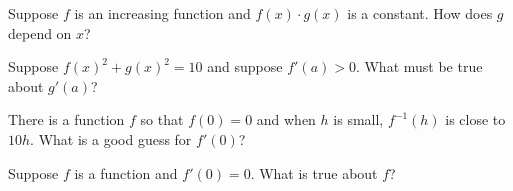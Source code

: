 \documentclass{ximera}
\newcommand{\recommendation}[1]{}
\begin{document}
\begin{shuffle}
\begin{problem}
  Suppose $f$ is an increasing function and $f(x) \cdot g(x)$ is a constant.  How does $g$ depend on $x$?
  \begin{multipleChoice}
  \end{multipleChoice}
\end{problem}

\begin{problem}
  Suppose $f(x)^2 + g(x)^2 = 10$ and suppose $f'(a) > 0$.  What must be true about $g'(a)$?
  \begin{multipleChoice}
  \end{multipleChoice}
\end{problem}



\begin{problem}
  There is a function $f$ so that $f(0) = 0$ and when $h$ is small, $f^{-1}(h)$ is close to $10 h$.  What is a good guess for $f'(0)$?
  \begin{multipleChoice}
  \end{multipleChoice}
\end{problem}

\begin{problem}
  Suppose $f$ is a function and $f'(0) = 0$.  What is true about $f$?
  \begin{multipleChoice}
  \end{multipleChoice}
\end{problem}




\end{shuffle}
\end{document}
